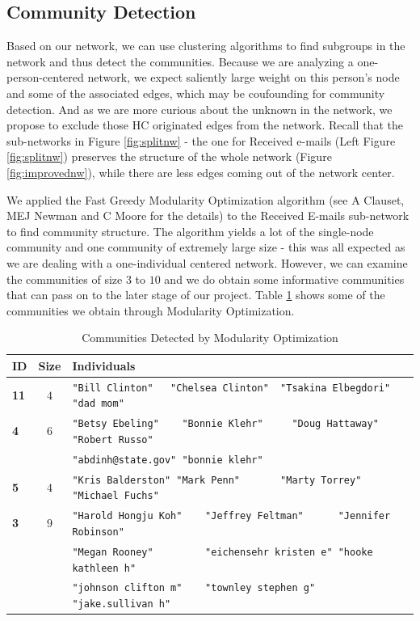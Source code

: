 \documentclass[11pt]{article}
\begin{document}
\subsection{Community Detection}
Based on our network, we can use clustering algorithms to find subgroups in the network and thus detect the communities. Because we are analyzing a one-person-centered network, we expect saliently large weight on this person's node and some of the associated edges, which may be coufounding for community detection. And as we are more curious about the unknown in the network, we propose to exclude those HC originated edges from the network. Recall that the sub-networks in Figure \ref{fig:splitnw} - the one for Received e-mails (Left Figure \ref{fig:splitnw}) preserves the structure of the whole network (Figure \ref{fig:improvednw}), while there are less edges coming out of the network center.  

We applied the Fast Greedy Modularity Optimization algorithm (see A Clauset, MEJ Newman and C Moore \cite{greedy_mod} for the details) to the Received E-mails sub-network to find community structure. The algorithm yields a lot of the single-node community and one community of extremely large size - this was all expected as we are dealing with a one-individual centered network. However, we can examine the communities of size $3$ to $10$ and we do obtain some informative communities that can pass on to the later stage of our project. Table \ref{tab:greedy} shows some of the communities we obtain through Modularity Optimization.
\begin{table}
\caption{Communities Detected by Modularity Optimization}
\label{tab:greedy}
\centering
\begin{tabular}{|l |c| l|}\hline
{\bf ID} & \bf Size & \bf Individuals \\ \hline \hline
\bf 11 & $4$ & \verb+"Bill Clinton"   "Chelsea Clinton"  "Tsakina Elbegdori"    "dad mom"+ \\ \hline
\bf 4 & $6$ & \verb+"Betsy Ebeling"    "Bonnie Klehr"     "Doug Hattaway"    "Robert Russo"+\\
&& \verb+"abdinh@state.gov" "bonnie klehr"+\\ \hline
{\bf 5} & $4$ &\verb+"Kris Balderston" "Mark Penn"       "Marty Torrey"    "Michael Fuchs"+\\ \hline
{\bf 3} & $9$ & \verb+"Harold Hongju Koh"    "Jeffrey Feltman"      "Jennifer Robinson"+\\
&& \verb+"Megan Rooney"         "eichensehr kristen e" "hooke kathleen h"+\\
&& \verb+"johnson clifton m"    "townley stephen g"    "jake.sullivan h"+ \\
\hline 
\end{tabular}
\end{table}
\end{document}
